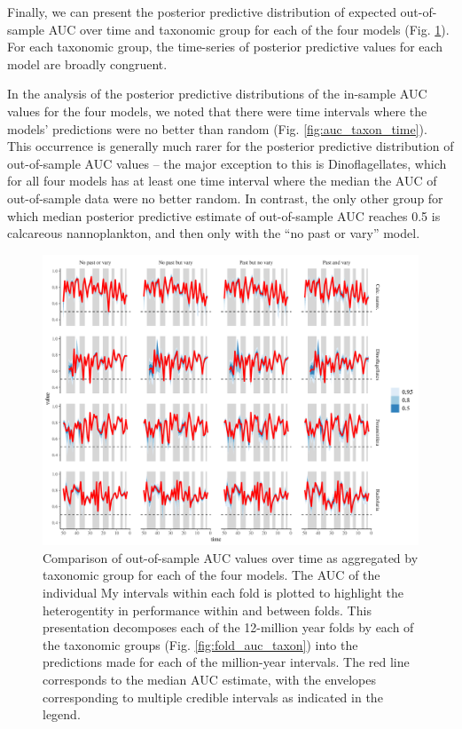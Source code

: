 \documentclass[12pt,letterpaper]{article}
\begin{document}
Finally, we can present the posterior predictive distribution of expected out-of-sample AUC over time and taxonomic group for each of the four models (Fig. \ref{fig:fold_auc_taxon_time}). For each taxonomic group, the time-series of posterior predictive values for each model are broadly congruent. 

In the analysis of the posterior predictive distributions of the in-sample AUC values for the four models, we noted that there were time intervals where the models' predictions were no better than random (Fig. \ref{fig:auc_taxon_time}). This occurrence is generally much rarer for the posterior predictive distribution of out-of-sample AUC values -- the major exception to this is Dinoflagellates, which for all four models has at least one time interval where the median the AUC of out-of-sample data were no better random. In contrast, the only other group for which median posterior predictive estimate of out-of-sample AUC reaches 0.5 is calcareous nannoplankton, and then only with the ``no past or vary'' model.
\begin{figure}[ht]
  \centering
  \includegraphics[width=\textwidth,height=0.5\textheight,keepaspectratio=true]{../results/figure/fold_auc_taxon_time}
  \caption{Comparison of out-of-sample AUC values over time as aggregated by taxonomic group for each of the four models. The AUC of the individual My intervals within each fold is plotted to highlight the heterogentity in performance within and between folds. This presentation decomposes each of the 12-million year folds by each of the taxonomic groups (Fig. \ref{fig:fold_auc_taxon}) into the predictions made for each of the million-year intervals. The red line corresponds to the median AUC estimate, with the envelopes corresponding to multiple credible intervals as indicated in the legend.}
  \label{fig:fold_auc_taxon_time}
\end{figure}
\end{document}
